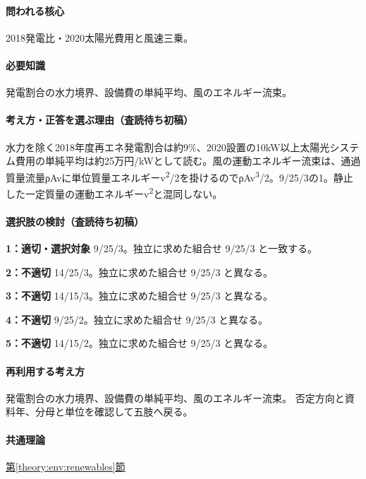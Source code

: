\paragraph{問われる核心} 2018発電比・2020太陽光費用と風速三乗。

\paragraph{必要知識} 発電割合の水力境界、設備費の単純平均、風のエネルギー流束。

\paragraph{考え方・正答を選ぶ理由（査読待ち初稿）} 水力を除く2018年度再エネ発電割合は約9\%、2020設置の10kW以上太陽光システム費用の単純平均は約25万円/kWとして読む。風の運動エネルギー流束は、通過質量流量ρAvに単位質量エネルギーv\textsuperscript{2}/2を掛けるのでρAv\textsuperscript{3}/2。9/25/3の1。静止した一定質量の運動エネルギーv\textsuperscript{2}と混同しない。

\paragraph{選択肢の検討（査読待ち初稿）}\mbox{}\par

\noindent\textbf{1：適切・選択対象} 9/25/3。独立に求めた組合せ 9/25/3 と一致する。\par

\noindent\textbf{2：不適切} 14/25/3。独立に求めた組合せ 9/25/3 と異なる。\par

\noindent\textbf{3：不適切} 14/15/3。独立に求めた組合せ 9/25/3 と異なる。\par

\noindent\textbf{4：不適切} 9/25/2。独立に求めた組合せ 9/25/3 と異なる。\par

\noindent\textbf{5：不適切} 14/15/2。独立に求めた組合せ 9/25/3 と異なる。\par

\paragraph{再利用する考え方} 発電割合の水力境界、設備費の単純平均、風のエネルギー流束。 否定方向と資料年、分母と単位を確認して五肢へ戻る。

\paragraph{共通理論} \hyperref[theory:env:renewables]{第\ref*{theory:env:renewables}節}

